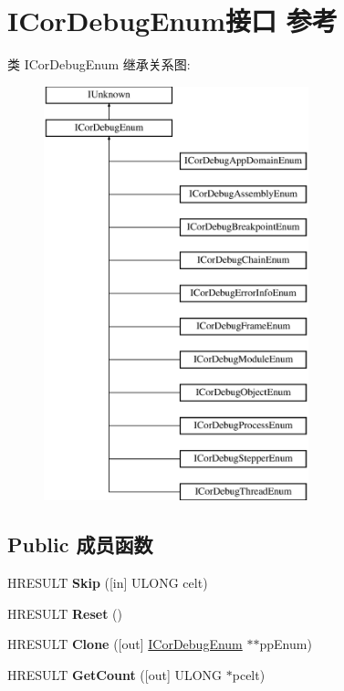 \hypertarget{interface_i_cor_debug_enum}{}\section{I\+Cor\+Debug\+Enum接口 参考}
\label{interface_i_cor_debug_enum}
类 I\+Cor\+Debug\+Enum 继承关系图\+:\begin{figure}[H]
\begin{center}
\leavevmode
\includegraphics[height=12.000000cm]{interface_i_cor_debug_enum}
\end{center}
\end{figure}
\subsection*{Public 成员函数}
\begin{DoxyCompactItemize}
\item 
\mbox{\label{interface_i_cor_debug_enum_ab9fc7a4f59b8d9cdef06fe56fa8afec5}} 
H\+R\+E\+S\+U\+LT {\bfseries Skip} (\mbox{[}in\mbox{]} U\+L\+O\+NG celt)
\item 
\mbox{\label{interface_i_cor_debug_enum_ae473643f9b268d7cd4666ccd7a5d313b}} 
H\+R\+E\+S\+U\+LT {\bfseries Reset} ()
\item 
\mbox{\label{interface_i_cor_debug_enum_abd2ba99e598d31a9da28ad047979cdbf}} 
H\+R\+E\+S\+U\+LT {\bfseries Clone} (\mbox{[}out\mbox{]} \hyperlink{interface_i_cor_debug_enum}{I\+Cor\+Debug\+Enum} $\ast$$\ast$pp\+Enum)
\item 
\mbox{\label{interface_i_cor_debug_enum_a9366f465038adf6d36e2186a2496a605}} 
H\+R\+E\+S\+U\+LT {\bfseries Get\+Count} (\mbox{[}out\mbox{]} U\+L\+O\+NG $\ast$pcelt)
\end{DoxyCompactItemize}
